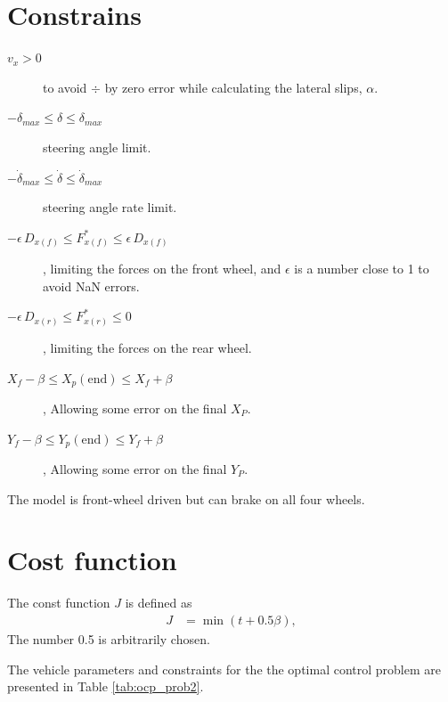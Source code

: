 \section{Constrains}
\begin{description}
    \item[$v_x > 0$] to avoid $\div$ by zero error while calculating the lateral slips, $\alpha$.
    \item[$-\delta_{max} \leq \delta \leq \delta_{max}$] steering angle limit.
    \item[$-\dot\delta_{max} \leq \dot\delta \leq \dot\delta_{max}$] steering angle rate limit.
    \item[$-\epsilon\,D_{x(f)} \leq F_{x(f)}^* \leq \epsilon\,D_{x(f)}$], limiting the forces on the front wheel, and $\epsilon$ is a number close to 1 to avoid NaN errors. 
    \item[$-\epsilon\,D_{x(r)} \leq F_{x(r)}^* \leq 0$], limiting the forces on the rear wheel.
    \item[$X_f - \beta \leq X_p(\text{end}) \leq X_f + \beta $], Allowing some error on the final $X_P$.
    \item[$Y_f - \beta \leq Y_p(\text{end}) \leq Y_f + \beta $], Allowing some error on the final $Y_P$.
\end{description}
The model is front-wheel driven but can brake on all four wheels.

\section{Cost function}
The const function $J$ is defined as 
\begin{align}
    J &= \min{\left(t + 0.5\beta\right)},
\end{align}
The number 0.5 is arbitrarily chosen. 

The vehicle parameters and constraints for the the optimal control problem are presented in Table \ref{tab:ocp_prob2}.

